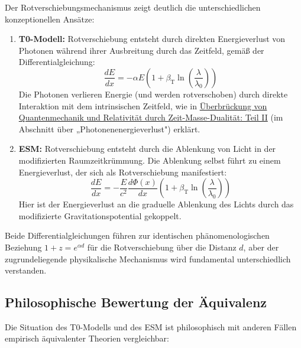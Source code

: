 \documentclass[12pt,a4paper]{article}
\newcommand{\betaT}{\beta_{\text{T}}}
\begin{document}
	Der Rotverschiebungsmechanismus zeigt deutlich die unterschiedlichen konzeptionellen Ansätze:
	
	\begin{enumerate}
		\item \textbf{T0-Modell:} Rotverschiebung entsteht durch direkten Energieverlust von Photonen während ihrer Ausbreitung durch das Zeitfeld, gemäß der Differentialgleichung:
		\begin{equation}
			\frac{dE}{dx} = -\alpha E \left(1 + \betaT \ln\left(\frac{\lambda}{\lambda_0}\right)\right)
		\end{equation}
		Die Photonen verlieren Energie (und werden rotverschoben) durch direkte Interaktion mit dem intrinsischen Zeitfeld, wie in \href{https://github.com/jpascher/T0-Time-Mass-Duality/tree/main/2/pdf/English/QMRelTimeMassPart2En.pdf}{Überbrückung von Quantenmechanik und Relativität durch Zeit-Masse-Dualität: Teil II} (im Abschnitt über „Photonenenergieverlust") erklärt.
		
		\item \textbf{ESM:} Rotverschiebung entsteht durch die Ablenkung von Licht in der modifizierten Raumzeitkrümmung. Die Ablenkung selbst führt zu einem Energieverlust, der sich als Rotverschiebung manifestiert:
		\begin{equation}
			\frac{dE}{dx} = -\frac{E}{c^2} \frac{d\Phi(x)}{dx} \left(1 + \betaT \ln\left(\frac{\lambda}{\lambda_0}\right)\right)
		\end{equation}
		Hier ist der Energieverlust an die graduelle Ablenkung des Lichts durch das modifizierte Gravitationspotential gekoppelt.
	\end{enumerate}
	
	Beide Differentialgleichungen führen zur identischen phänomenologischen Beziehung $1 + z = e^{\alpha d}$ für die Rotverschiebung über die Distanz $d$, aber der zugrundeliegende physikalische Mechanismus wird fundamental unterschiedlich verstanden.
	
	\subsection{Philosophische Bewertung der Äquivalenz}
	\label{subsec:philosophical_evaluation}
	
	Die Situation des T0-Modells und des ESM ist philosophisch mit anderen Fällen empirisch äquivalenter Theorien vergleichbar:
	
\end{document}
